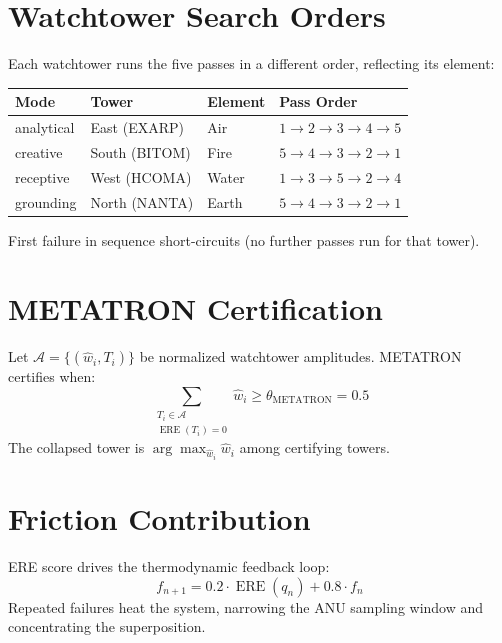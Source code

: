 \documentclass{article}
\begin{document}
\section{Watchtower Search Orders}
Each watchtower runs the five passes in a different order, reflecting its element:

\begin{center}
\begin{tabular}{llll}
\toprule
Mode & Tower & Element & Pass Order \\
\midrule
analytical & East (EXARP) & Air   & $1 \to 2 \to 3 \to 4 \to 5$ \\
creative   & South (BITOM) & Fire  & $5 \to 4 \to 3 \to 2 \to 1$ \\
receptive  & West (HCOMA) & Water & $1 \to 3 \to 5 \to 2 \to 4$ \\
grounding  & North (NANTA) & Earth & $5 \to 4 \to 3 \to 2 \to 1$ \\
\bottomrule
\end{tabular}
\end{center}

First failure in sequence short-circuits (no further passes run for that tower).

\section{METATRON Certification}
Let $\mathcal{A} = \{(\hat{w}_i, T_i)\}$ be normalized watchtower amplitudes. METATRON certifies when:
\begin{equation}
  \sum_{\substack{T_i \in \mathcal{A} \\ \operatorname{ERE}(T_i) = 0}} \hat{w}_i \geq \theta_{\text{METATRON}} = 0.5
\end{equation}
The collapsed tower is $\arg\max_{\hat{w}_i} \hat{w}_i$ among certifying towers.

\section{Friction Contribution}
ERE score drives the thermodynamic feedback loop:
\begin{equation}
  f_{n+1} = 0.2 \cdot \operatorname{ERE}(q_n) + 0.8 \cdot f_n
\end{equation}
Repeated failures heat the system, narrowing the ANU sampling window and concentrating the superposition.
\end{document}

